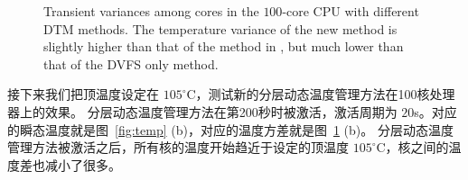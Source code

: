 \begin{figure}
  \centering

  \caption{Transient variances among cores in the $100$-core
    CPU with different DTM methods. The temperature variance of the
    new method is slightly higher than that of the method in
    \cite{MaWang:APCCAS'14}, but much lower than that of the DVFS only
  method.}\label{fig:var_comp}
\end{figure}

接下来我们把顶温度设定在 $105^{\circ}$C，测试新的分层动态温度管理方法在100核处理器上的效果。
分层动态温度管理方法在第200秒时被激活，激活周期为 $20$s。对应的瞬态温度就是图~\ref{fig:temp} (b)，对应的温度方差就是图~\ref{fig:var_comp} (b)。
分层动态温度管理方法被激活之后，所有核的温度开始趋近于设定的顶温度 $105^{\circ}$C，核之间的温度差也减小了很多。

